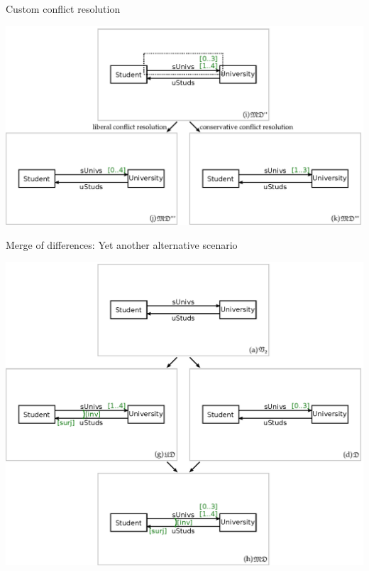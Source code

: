 \documentclass[dvips,slidetop,mathserif,brown]{beamer}
\begin{document}
\begin{frame}{Custom conflict resolution}
  \begin{center}
    \includegraphics[scale=0.5]{ex_project_vc_custom_md2_md3}
  \end{center}
\end{frame}

\begin{frame}{Merge of differences: Yet another alternative scenario}
  \begin{center}
    \includegraphics[scale=0.5]{ex_project_vc_custom_normalisation_md}
  \end{center}
\end{frame}
\end{document}
